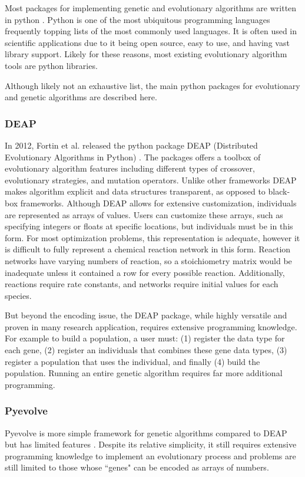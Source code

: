 \documentclass[12pt]{report}
\begin{document}
Most packages for implementing genetic and evolutionary algorithms are written in python \cite{python3}. Python is one of the most ubiquitous programming languages frequently topping lists of the most commonly used languages. It is often used in scientific applications due to it being open source, easy to use, and having vast library support. Likely for these reasons, most existing evolutionary algorithm tools are python libraries.

Although likely not an exhaustive list, the main python packages for evolutionary and genetic algorithms are described here.


\subsubsection{DEAP}
In 2012, Fortin et al. released the python package DEAP (Distributed Evolutionary Algorithms in Python) \cite{DEAP_JMLR2012}. The packages offers a toolbox of evolutionary algorithm features including different types of crossover, evolutionary strategies, and mutation operators. Unlike other frameworks DEAP makes algorithm explicit and data structures transparent, as opposed to black-box frameworks. Although DEAP allows for extensive customization, individuals are represented as arrays of values. Users can customize these arrays, such as specifying integers or floats at specific locations, but individuals must be in this form. For most optimization problems, this representation is adequate, however it is difficult to fully represent a chemical reaction network in this form. Reaction networks have varying numbers of reaction, so a stoichiometry matrix would be inadequate unless it contained a row for every possible reaction. Additionally, reactions require rate constants, and networks require initial values for each species. 

But beyond the encoding issue, the DEAP package, while highly versatile and proven in many research application, requires extensive programming knowledge. For example to build a population, a user must: (1) register the data type for each gene, (2) register an individuals that combines these gene data types, (3) register a population that uses the individual, and finally (4) build the population. Running an entire genetic algorithm requires far more additional programming. 

\subsubsection{Pyevolve}
Pyevolve is more simple framework for genetic algorithms compared to DEAP but has limited features \cite{pyevolve}. Despite its relative simplicity, it still requires extensive programming knowledge to implement an evolutionary process and problems are still limited to those whose ``genes" can be encoded as arrays of numbers. 
\end{document}
